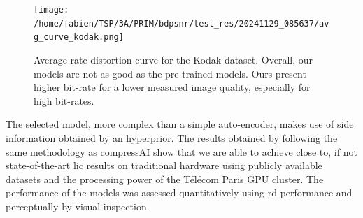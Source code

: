 \begin{figure}
    \centering
    \texttt{[image: /home/fabien/TSP/3A/PRIM/bdpsnr/test\_res/20241129\_085637/avg\_curve\_kodak.png]}
    \caption{Average rate-distortion curve for the Kodak dataset. Overall, our models are not as good as the pre-trained models. Ours present higher bit-rate for a lower measured image quality, especially for high bit-rates.}
    \label{bdpsnr_4}
\end{figure}

The selected model, more complex than a simple auto-encoder, makes use of side information obtained by an hyperprior. The results obtained by following the same methodology as compressAI show that we are able to achieve close to, if not state-of-the-art \acrshort{lic} results on traditional hardware using publicly available datasets and the processing power of the Télécom Paris GPU cluster. The performance of the models was assessed quantitatively using \acrshort{rd} performance and perceptually by visual inspection.